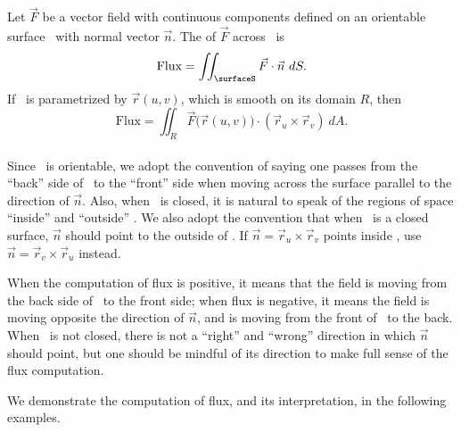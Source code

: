 {Let $\vec F$ be a vector field with continuous components defined on an orientable surface \surfaceS\ with normal vector $\vec n$. The  of $\vec F$ across \surfaceS\ is
$$\text{Flux} = \iint_\surfaceS \vec F\cdot \vec n\ dS.$$
If \surfaceS\ is parametrized by $\vec r(u,v)$, which is smooth on its domain $R$, then
$$\text{Flux} = \iint_R \vec F\big(\vec r(u,v)\big)\cdot (\vec r_u\times \vec r_v)\ dA.$$
}\\

Since \surfaceS\ is orientable, we adopt the convention of saying one passes from the ``back'' side of \surfaceS\ to the ``front'' side when moving across the surface parallel to the direction of $\vec n$. Also, when \surfaceS\ is closed, it is natural to speak of the regions of space ``inside'' and ``outside'' \surfaceS. We also adopt the convention that when \surfaceS\ is a closed surface, $\vec n$ should point to the outside of \surfaceS. If $\vec n = \vec r_u\times\vec r_v$ points inside \surfaceS, use $\vec n = \vec r_v\times \vec r_u$ instead.

When the computation of flux is positive, it means that the field is moving from the back side of \surfaceS\ to the front side; when flux is negative, it means the field is moving opposite the direction of $\vec n$, and is moving from the front of \surfaceS\ to the back. When \surfaceS\ is not closed, there is not a ``right'' and ``wrong'' direction in which $\vec n$ should point, but one should be mindful of its direction to make full sense of the flux computation.

We demonstrate the computation of flux, and its interpretation, in the following examples.\\

